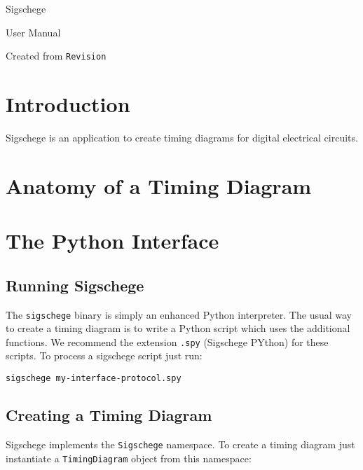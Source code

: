 \documentclass[11pt]{article}
\begin{document}
\begin{center}
\Huge Sigschege

\vspace{1cm}

\LARGE User Manual

\vspace{3cm}

Created from \verb$Revision$
  
\end{center}

\eject

\section{Introduction}
\label{sec:intro}

Sigschege is an application to create timing diagrams for digital electrical circuits.



\section{Anatomy of a Timing Diagram}
\label{sec:anatomy}



\section{The Python Interface}
\label{sec:python}

\subsection{Running Sigschege}

The \texttt{sigschege} binary is simply an enhanced Python interpreter. The
usual way to create a timing diagram is to write a Python script which uses the
additional functions. We recommend the extension \texttt{.spy} (Sigschege PYthon) for these
scripts. To process a sigschege script just run:

\begin{center}
  \texttt{sigschege my-interface-protocol.spy}
\end{center}


\subsection{Creating a Timing Diagram}

Sigschege implements the \texttt{Sigschege} namespace. To create a timing
diagram just instantiate a \texttt{TimingDiagram} object from this namespace:
\end{document}
